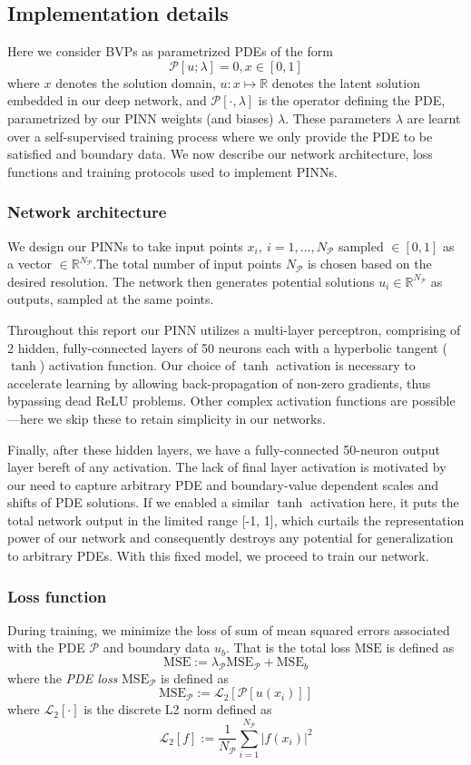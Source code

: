 \documentclass[11pt]{article}
\newcommand{\abs}[1]{\left\lvert#1\right\rvert}
\newcommand{\mse}{\textrm{MSE}}
\newcommand{\pde}{\ensuremath{\mathcal{P}}}
\newcommand{\Ltwo}[1]{\ensuremath{\mathcal{L}_2\left[#1\right]}}
\begin{document}
\subsection{Implementation details}
\label{sec:orgbba7158}
Here we consider BVPs as parametrized PDEs of the form
\[ \mathcal{P}[u ; \lambda] = 0, x \in [0, 1] \]
where \(x\) denotes the solution domain, \(u : x \mapsto \mathbb{R}\)
denotes the latent solution embedded in
our deep network, and \(\pde[\cdot, \lambda]\) is the operator defining the PDE,
parametrized by our PINN weights (and biases) \(\lambda\). These
parameters \(\lambda\) are learnt over a self-supervised training process
where we only provide the PDE to be satisfied and boundary data.
We now describe our network architecture, loss functions and training protocols used to implement PINNs.

\subsubsection{Network architecture}
\label{sec:org7c8f50e}
We design our PINNs to take input points \(x_i,~i = 1, \dots,  N_\pde\)
sampled \(\in [0, 1]\) as a vector \(\in \mathbb{R}^{N_\pde}\).The total
number of input points \(N_\pde\) is chosen based on the desired resolution. The network then
generates potential solutions
\(u_i \in \mathbb{R}^{N_\pde}\) as outputs, sampled at the same points.

Throughout this report our PINN utilizes a multi-layer perceptron, comprising of 2
hidden, fully-connected layers of 50 neurons each with a hyperbolic tangent
(\(\tanh\)) activation function. Our choice of \(\tanh\) activation is
necessary to accelerate learning by allowing back-propagation of non-zero
gradients, thus bypassing dead ReLU problems.
Other complex activation functions \cite{jagtap2020adaptive} are possible---here we
skip these to retain simplicity in our networks.

Finally, after these hidden layers, we have a fully-connected
50-neuron output layer bereft of any activation. The lack of final layer
activation is motivated by our need to capture arbitrary PDE and
boundary-value dependent scales and shifts of PDE solutions. If we
enabled a similar \(\tanh\) activation here, it puts the total network
output in the limited range [-1, 1], which curtails the representation power
of our network and consequently destroys any potential for generalization to
arbitrary PDEs. With this fixed model, we proceed to train our network.

\subsubsection{Loss function}
\label{sec:org9165bb2}
During training, we minimize the loss of sum of mean squared errors
associated with the PDE \(\pde\) and boundary data \(u_{b}\). That
is the total loss \(\mse\) is defined as
\[ \mse := \lambda_{\pde} \mse_{\pde} + \mse_{b} \]
where the \emph{PDE loss} \(\mse_{\pde}\) is defined as
\[ \mse_{\pde} :=  \Ltwo{\pde[u(x_i)]}\]
where \(\Ltwo{\cdot}\) is the discrete L2 norm defined as
\[ \Ltwo{f} := \frac{1}{N_\pde}\sum_{i=1}^{N_\pde} \abs{f(x_i)}^2 \]
\end{document}
